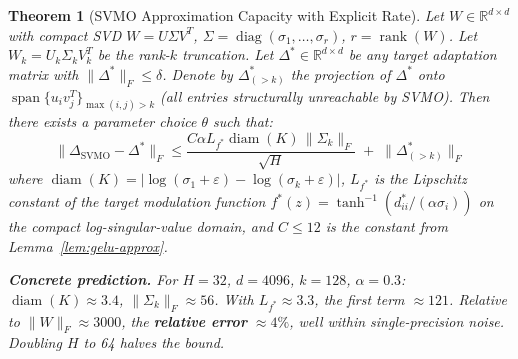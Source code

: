 \documentclass{scpe}
\newtheorem{theorem}{Theorem}[section]
\newcommand{\RR}{\mathbb{R}}
\newcommand{\diag}{\operatorname{diag}}
\newcommand{\rank}{\operatorname{rank}}
\newcommand{\diam}{\operatorname{diam}}
\newcommand{\Span}{\operatorname{span}}
\begin{document}
\begin{theorem}[SVMO Approximation Capacity with Explicit Rate]
\label{thm:svmo-approx}
Let $W \in \RR^{d \times d}$ with compact SVD $W = U\Sigma V^T$, $\Sigma = \diag(\sigma_1,\dots,\sigma_r)$, $r = \rank(W)$. Let $W_k = U_k \Sigma_k V_k^T$ be the rank-$k$ truncation. Let $\Delta^* \in \RR^{d \times d}$ be any target adaptation matrix with $\|\Delta^*\|_F \leq \delta$. Denote by $\Delta^*_{(>k)}$ the projection of $\Delta^*$ onto $\Span\{u_i v_j^T\}_{\max(i,j) > k}$ (all entries structurally unreachable by SVMO). Then there exists a parameter choice $\theta$ such that:
\begin{equation}
\|\Delta_{\text{SVMO}} - \Delta^*\|_F \leq \frac{C \alpha L_{f^*} \diam(K) \,\|\Sigma_k\|_F}{\sqrt{H}} \;+\; \|\Delta^*_{(>k)}\|_F
\end{equation}
where $\diam(K) = |\log(\sigma_1+\varepsilon) - \log(\sigma_k+\varepsilon)|$, $L_{f^*}$ is the Lipschitz constant of the target modulation function $f^*(z) = \tanh^{-1}(d_{ii}^*/(\alpha\sigma_i))$ on the compact log-singular-value domain, and $C \leq 12$ is the constant from Lemma~\ref{lem:gelu-approx}.

\textbf{Concrete prediction.} For $H{=}32$, $d{=}4096$, $k{=}128$, $\alpha{=}0.3$: $\diam(K) \approx 3.4$, $\|\Sigma_k\|_F \approx 56$. With $L_{f^*} \approx 3.3$,
the first term $\approx 121$. Relative to $\|W\|_F \approx 3000$, the \textbf{relative error} $\approx 4\%$, well within single-precision noise. Doubling $H$ to 64 halves the bound.
\end{theorem}
\end{document}
